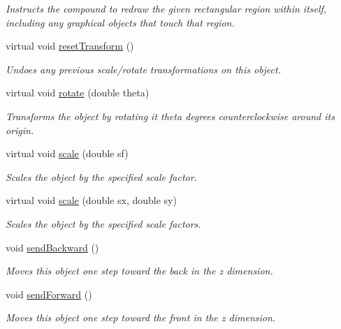 \begin{DoxyCompactItemize}
\begin{DoxyCompactList}\small\item\em Instructs the compound to redraw the given rectangular region within itself, including any graphical objects that touch that region. \end{DoxyCompactList}\item 
virtual void \mbox{\hyperlink{classGObject_a6022a1fd1e5dcd2fd5585e5a36aa3f37}{reset\+Transform}} ()
\begin{DoxyCompactList}\small\item\em Undoes any previous scale/rotate transformations on this object. \end{DoxyCompactList}\item 
virtual void \mbox{\hyperlink{classGObject_ae1ffaa12185dfd5ba464f7d87c329e26}{rotate}} (double theta)
\begin{DoxyCompactList}\small\item\em Transforms the object by rotating it {\ttfamily theta} degrees counterclockwise around its origin. \end{DoxyCompactList}\item 
virtual void \mbox{\hyperlink{classGObject_ad2e1900f730475c2d044817db03b38d6}{scale}} (double sf)
\begin{DoxyCompactList}\small\item\em Scales the object by the specified scale factor. \end{DoxyCompactList}\item 
virtual void \mbox{\hyperlink{classGObject_a63641f69d610d0b951357d35a0c3b1e3}{scale}} (double sx, double sy)
\begin{DoxyCompactList}\small\item\em Scales the object by the specified scale factors. \end{DoxyCompactList}\item 
void \mbox{\hyperlink{classGObject_ab6747f40313c531c2db32edb5b63b9b7}{send\+Backward}} ()
\begin{DoxyCompactList}\small\item\em Moves this object one step toward the back in the {\itshape z} dimension. \end{DoxyCompactList}\item 
void \mbox{\hyperlink{classGObject_a710b3e449c9facba7847c91ab170d281}{send\+Forward}} ()
\begin{DoxyCompactList}\small\item\em Moves this object one step toward the front in the {\itshape z} dimension. \end{DoxyCompactList}\item 

\end{DoxyCompactItemize}
